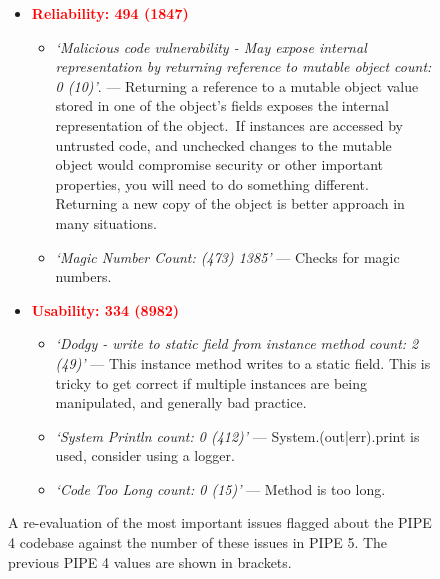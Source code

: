 \begin{figure}[ptb]
\begin{framed}
\begin{itemize}
    \item \textcolor{red}{\textbf{Reliability: 494 (1847)}}
    \begin{itemize}
        \item \textit{`Malicious code vulnerability - May expose internal representation by returning reference to mutable object count: 0 (10)'}. --- Returning a reference to a mutable object value stored in one of the object's fields exposes the internal representation of the object. If instances are accessed by untrusted code, and unchecked changes to the mutable object would compromise security or other important properties, you will need to do something different. Returning a new copy of the object is better approach in many situations.
        \item \textit{`Magic Number Count: (473) 1385'} --- Checks for magic numbers.
    \end{itemize}

    \item \textcolor{red}{\textbf{Usability: 334 (8982)}}
    \begin{itemize}
        \item \textit{`Dodgy - write to static field from instance method count: 2 (49)'} --- This instance method writes to a static field. This is tricky to get correct if multiple instances are being manipulated, and generally bad practice. 
        \item \textit{`System Println count: 0 (412)'} --- System.(out|err).print is used, consider using a logger.
        \item \textit{`Code Too Long count: 0 (15)'} --- Method is too long.

    \end{itemize}
\end{itemize} 
\end{framed}
\caption{A re-evaluation of the most important issues flagged about the PIPE 4 codebase against the number of these issues in PIPE 5. The previous PIPE 4 values are shown in brackets.}
\label{fig:eval_qaplug}
\end{figure}
\normallinespacing
